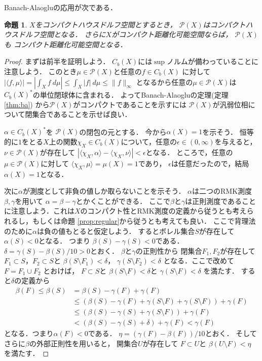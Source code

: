 \documentclass[leqno, a4paper, 12pt]{jsarticle}
\newtheorem{prop}[thm]{命題}
\begin{document}
Banach-Alaogluの応用が次である．
\begin{prop}\label{prop:cptcpt}
$X$をコンパクトハウスドルフ空間とするとき，
$\mathcal{P}(X)$はコンパクトハウスドルフ空間となる．
さらに$X$がコンパクト距離化可能空間ならば，
$\mathcal{P}(X)$も
コンパクト距離化可能空間となる．
\end{prop}
\begin{proof}
まずは前半を証明しよう．
$C_{b}(X)$には$\sup$ノルムが備わっていることに注意しよう．
このとき$\mu\in \mathcal{P}(X)$と任意の$f\in C_{b}(X)$
に対して
$|\langle f, \mu\rangle |
=
|\int_{X} f \ d\mu|
\le \int_{X}|f|\ d\mu
\le \|f\|_{\infty}
$
となるから任意の$\mu\in \mathcal{P}(X)$は
$C_{b}(X)^{*}$の単位閉球体に含まれる．
よってBanach-Alaogluの定理(定理 \ref{thm:ba})
から$\mathcal{P}(X)$がコンパクトであることを示すには
$\mathcal{P}(X)$が汎弱位相について閉集合であることを示せば良い．

$\alpha\in C_{b}(X)^{*}$を
$\mathcal{P}(X)$の閉包の元とする．
今から$\alpha(X)=1$を示そう．
恒等的に$1$をとる$X$上の関数$\chi_{X}\in C_{b}(X)$について，任意の$\epsilon \in (0, \infty)$を与えると，
$\nu\in \mathcal{P}(X)$が存在して
$|\langle \chi_{X}, \alpha \rangle -\langle \chi_{X}, \nu\rangle  |<\epsilon$となる．
ところで，任意の
$\mu\in \mathcal{P}(X)$に対して
$\langle \chi_{X}, \mu \rangle =\mu(X)=1$であり，
$\epsilon$は任意だったので，結局
$\alpha(X)=1$となる．

次に$\alpha$が測度として非負の値しか取らないことを示そう．
$\alpha$は二つのRMK測度$\beta, \gamma$を用いて
$\alpha=\beta- \gamma$とかくことができる．
ここで$\beta$と$\gamma$は正則測度であることに注意しよう．これは$X$のコンパクト性とRMK測度の定義から従うとも考えられるし，もしくは命題 \ref{prop:regular}から従うとも考えても良い．
ここで背理法のために$\alpha$は負の値もとると仮定しよう．
するとボレル集合$S$が存在して
$\alpha(S)<0$となる．
つまり
$\beta(S)-\gamma(S)<0$である．
$\delta=\gamma(S)-\beta(S)/10>0$とおく．
$\beta$と$\gamma$の正則性から
閉集合$F_{1}, F_{2}$が存在して
$F_{1}\subset S$，$F_{2}\subset S$と
$\beta(S\setminus F_{1})<\delta$，
$\gamma(S\setminus F_{2})<\delta$
となる．ここで改めて$F=F_{1}\cup F_{2}$
とおけば，
$F\subset S$と
$\beta(S\setminus F)<\delta$と
$\gamma(S\setminus F)<\delta$
を満たす．
すると$\delta$の定義から
\begin{align*}
\beta(F)\le \beta(S)
&=\beta(S)-\gamma(F)+\gamma(F)\\
&\le 
(\beta(S)-\gamma(F)+\gamma(S\setminus F)+\gamma(S\setminus F))+\gamma(F)\\
&\le (\beta(S)-\gamma(S)+\gamma(S\setminus F))+\gamma(F)\\
&<
 (\beta(S)-\gamma(S)+\delta)+\gamma(F)
 <\gamma(F)
\end{align*}
となる．つまり$\alpha(F)<0$である．
$\eta=(\gamma(F)-\beta(F))/10$とおく．
そしてさらに$\beta$の外部正則性を用いると，
開集合$U$が存在して
$F \subset U$と
$\beta(U\setminus F)<\eta$
を満たす．


\end{proof}
\end{document}

